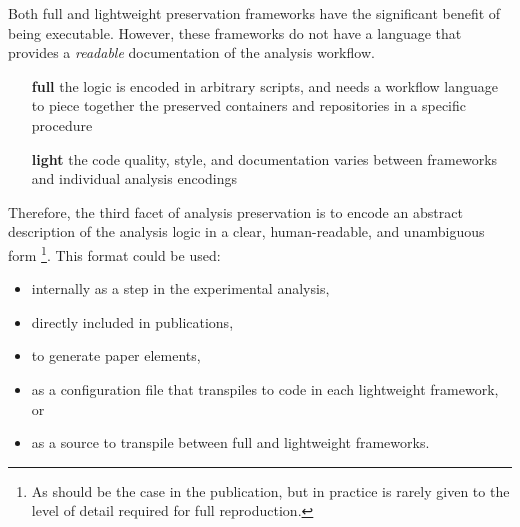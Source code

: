 \documentclass[11pt]{article}
\begin{document}
Both full and lightweight preservation frameworks have the significant benefit of being executable. %
However, these frameworks do not have a language that provides a \emph{readable} documentation of the analysis workflow.
\begin{itemize}
    \item[\textbf{full}] the logic is encoded in arbitrary scripts, and needs a workflow language to piece together the preserved containers and repositories in a specific procedure
    \item[\textbf{light}] the code quality, style, and documentation varies between frameworks and individual analysis encodings
\end{itemize}

Therefore, the third facet of \gls{analysis preservation} is to encode an abstract description of the analysis logic in a clear, human-readable, and unambiguous form%
\footnote{As should be the case in the publication, but in practice is rarely given to the level of detail required for full reproduction.}.
This format could be used:
\begin{itemize}
    \item internally as a step in the experimental analysis,
    \item directly included in publications,
    \item to generate paper elements,
    \item as a configuration file that transpiles to code in each lightweight framework, or
    \item as a source to transpile between full and lightweight frameworks.
\end{itemize}
\end{document}
